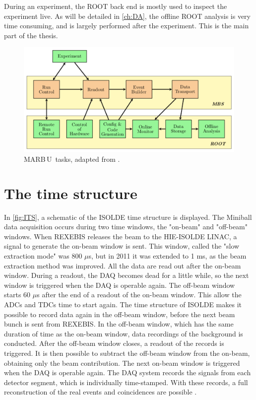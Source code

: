\documentclass[twoside,english]{uiofysmaster/uiofysmaster}
\newcommand{\MBOU}{MAR\belowbaseline[-2pt]{a}B\stackinset{l}{3pt}{b}{-3pt}{O}{O}\,U}
\let\orgautoref\autoref
\renewcommand{\autoref}
        {%
		 \def\sectionautorefname{Section}%
		 \def\subsectionautorefname{Section}%
		 \def\subsubsectionautorefname{Section}%
		 \def\chapterautorefname{Chapter}%
          \orgautoref}
\begin{document}
During an experiment, the ROOT back end is mostly used to inspect the experiment live. 
As will be detailed in \autoref{ch:DA}, the offline ROOT analysis is very time consuming, and is largely performed after the experiment. 
This is the main part of the thesis.

\begin{figure}[ht]
	\centering
	\includegraphics[width=\linewidth]{Images/MARaBOOU.png}
	\caption{\protect\MBOU\ tasks, adapted from \cite{Maraboou}.}
	\label{fig:MARaBOOU}
\end{figure}


\section{The time structure}\label{sec:time_structure}
In \autoref{fig:ITS}, a schematic of the ISOLDE time structure is displayed. 
The Miniball data acquisition occurs during two time windows, the "on-beam" and "off-beam" windows. 
When REXEBIS releases the beam to the HIE-ISOLDE LINAC, a signal to generate the on-beam window is sent. 
This window, called the "slow extraction mode" was 800 $\mu$s, but in 2011 it was extended to 1 ms, as the beam extraction method was improved. 
All the data are read out after the on-beam window. 
During a readout, the DAQ becomes dead for a little while, so the next window is triggered when the DAQ is operable again.
The off-beam window starts 60 $\mu$s after the end of a readout of the on-beam window.
This allow the ADCs and TDCs time to start again.
The time structure of ISOLDE makes it possible to record data again in the off-beam window, before the next beam bunch is sent from REXEBIS.
In the off-beam window, which has the same duration of time as the on-beam window, data recordings of the background is conducted.
After the off-beam window closes, a readout of the records is triggered.
It is then possible to subtract the off-beam window from the on-beam, obtaining only the beam contribution. 
The next on-beam window is triggered when the DAQ is operable again.
The DAQ system records the signals from each detector segment, which is individually time-stamped. 
With these records, a full reconstruction of the real events and coincidences are possible \cite{NWarr-el}. 
\end{document}
